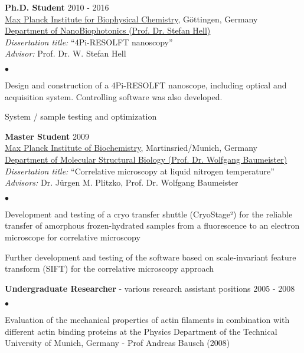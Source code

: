 \documentclass[margin,line]{res}
\newenvironment{list2}{
  \begin{list}{$\bullet$}{%
      \setlength{\itemsep}{0in}
      \setlength{\parsep}{0in} \setlength{\parskip}{0in}
      \setlength{\topsep}{0in} \setlength{\partopsep}{0in} 
      \setlength{\leftmargin}{0.2in}}}{\end{list}}
\begin{document}
\begin{resume}
{\bf Ph.D. Student} \hfill {2010 - 2016}\\
\href{https://www.mpibpc.mpg.de/en}{Max Planck Institute for Biophysical Chemistry}, Göttingen, Germany\\
\href{http://www.4pi.de/}{Department of NanoBiophotonics (Prof. Dr. Stefan Hell)}\\
{\it Dissertation title:} “4Pi-RESOLFT nanoscopy”\\
{\it Advisor:} Prof. Dr. W. Stefan Hell\\
\vspace*{-2mm}
\begin{list2}
\vspace*{-1mm}
\item Design and construction of a 4Pi-RESOLFT nanoscope, including optical and acquisition system. Controlling software was also developed. 
\item System / sample testing and optimization
\end{list2}
{\bf Master Student} \hfill {2009}\\
\href{https://www.biochem.mpg.de/en}{Max Planck Institute of Biochemistry}, Martinsried/Munich, Germany\\
\href{https://www.biochem.mpg.de/baumeister}{Department of Molecular Structural Biology (Prof. Dr. Wolfgang Baumeister)}\\
{\it Dissertation title:} “Correlative microscopy at liquid nitrogen temperature”\\
{\it Advisors:} Dr. Jürgen M. Plitzko, Prof. Dr. Wolfgang Baumeister\\
\vspace*{-2mm}
\begin{list2}
\vspace*{-1mm}
\item Development and testing of a cryo transfer shuttle (CryoStage²) for the reliable transfer of amorphous frozen-hydrated samples from a fluorescence to an electron microscope for correlative microscopy
\item Further development and testing of the software based on scale-invariant feature transform (SIFT) for the correlative microscopy approach
\end{list2}
{\bf Undergraduate Researcher} - various research assistant positions \hfill {2005 - 2008}\\
\vspace*{-2mm}
\begin{list2}
\vspace*{-1mm}
\item Evaluation of the mechanical properties of actin filaments in combination with different actin binding proteins at the Physics Department of the Technical University of Munich, Germany - Prof Andreas Bausch (2008)

\end{list2}
\end{resume}
\end{document}
